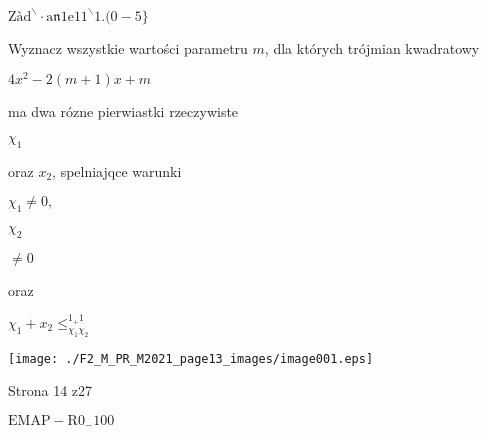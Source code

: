 \documentclass[a4paper,12pt]{article}
\begin{document}
$\mathrm{Z}\text{à} \mathrm{d}^{\backslash }\cdot \mathrm{a}\mathfrak{n}1\mathrm{e}11^{\backslash }1.(0-5\}$

Wyznacz wszystkie wartości parametru $m$, dla których trójmian kwadratowy

$4x^{2}-2(m+1)x+m$

ma dwa rózne pierwiastki rzeczywiste

$\chi_{1}$

oraz $x_{2}$, spelniajqce warunki

$\chi_{1} \neq 0,$

$\chi_{2}$

$\neq 0$

oraz

$\chi_{1} +x_{2} \leq_{\chi_{1}\chi_{2}}^{1_{+}1}$
\begin{center}
\texttt{[image: ./F2\_M\_PR\_M2021\_page13\_images/image001.eps]}
\end{center}
Strona 14 z27

$\mathrm{E}\mathrm{M}\mathrm{A}\mathrm{P}-\mathrm{R}0_{-}100$
\end{document}
